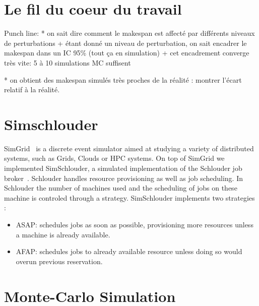 \documentclass[10pt,conference,compsocconf]{IEEEtran}
\begin{document}
\section{Le fil du coeur du travail}
Punch line:
*  on sait dire comment le makespan est affecté par différents niveaux de
perturbations 
    + étant donné un niveau de perturbation, on sait encadrer le
      makespan dans un IC 95\% (tout ça en simulation)
    + cet encadrement converge très vite: 5 à 10 simulations MC suffisent

* on obtient des makespan simulés très proches de la réalité : montrer l'écart
relatif à la réalité. 
\section{Simschlouder}

SimGrid~\cite{simgrid} is a discrete event simulator aimed at studying a variety
of distributed systems, such as Grids, Clouds  or HPC systems. On top of SimGrid
we implemented  SimSchlouder, a  simulated implementation  of the  Schlouder job
broker~\cite{Michon17}.  Schlouder handles resource  provisioning as well  as job
scheduling. In Schlouder the number of  machines used and the scheduling of jobs
on these  machine is controled  through a strategy. SimSchlouder  implements two
strategies :
\begin{itemize}
\item  ASAP: schedules  jobs as  soon as  possible, provisioning  more resources
  unless a machine is already available.
\item AFAP: schedules  jobs to already available resource  unless doing so
      would overun previous reservation.
\end{itemize}

\section{Monte-Carlo Simulation}
\end{document}
